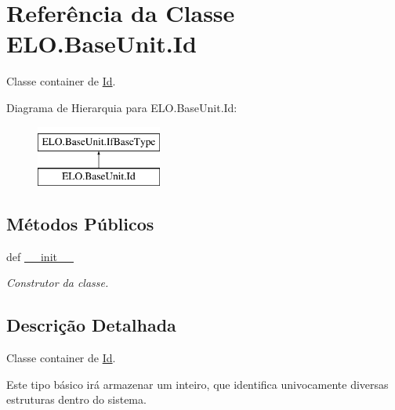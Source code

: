 \hypertarget{classELO_1_1BaseUnit_1_1Id}{\section{Referência da Classe E\-L\-O.\-Base\-Unit.\-Id}
\label{classELO_1_1BaseUnit_1_1Id}
}


Classe container de \hyperlink{classELO_1_1BaseUnit_1_1Id}{Id}.  


Diagrama de Hierarquia para E\-L\-O.\-Base\-Unit.\-Id\-:\begin{figure}[H]
\begin{center}
\leavevmode
\includegraphics[height=2.000000cm]{d7/dca/classELO_1_1BaseUnit_1_1Id}
\end{center}
\end{figure}
\subsection*{Métodos Públicos}
\begin{DoxyCompactItemize}
\item 
def \hyperlink{classELO_1_1BaseUnit_1_1Id_adc3e24ef020fb79dda540cdbec85b7a8}{\-\_\-\-\_\-init\-\_\-\-\_\-}
\begin{DoxyCompactList}\small\item\em Construtor da classe. \end{DoxyCompactList}\end{DoxyCompactItemize}


\subsection{Descrição Detalhada}
Classe container de \hyperlink{classELO_1_1BaseUnit_1_1Id}{Id}. 

Este tipo básico irá armazenar um inteiro, que identifica univocamente diversas estruturas dentro do sistema. 

